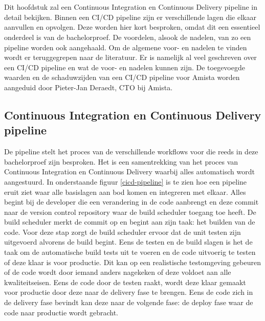 
\chapter{}
\label{ch:cicd-pipeline}
Dit hoofdstuk zal een Continuous Integration en Continuous Delivery pipeline in detail bekijken. Binnen een CI/CD pipeline zijn er verschillende lagen die elkaar aanvullen en opvolgen. Deze worden hier kort besproken, omdat dit een essentieel onderdeel is van de bachelorproef. De voordelen, alsook de nadelen, van zo een pipeline worden ook aangehaald. Om de algemene voor- en nadelen te vinden wordt er teruggegrepen naar de literatuur. Er is namelijk al veel geschreven over een CI/CD pipeline en wat de voor- en nadelen kunnen zijn. De toegevoegde waarden en de schaduwzijden van een CI/CD pipeline voor Amista worden aangeduid door Pieter-Jan Deraedt, CTO bij Amista.

    \section{Continuous Integration en Continuous Delivery pipeline}
    De pipeline stelt het proces van de verschillende workflows voor die reeds in deze bachelorproef zijn besproken. Het is een samentrekking van het proces van Continuous Integration en Continuous Delivery waarbij alles automatisch wordt aangestuurd. In onderstaande figuur \ref{cicd-pipeline} is te zien hoe een pipeline eruit ziet waar alle basislagen aan bod komen en integreren met elkaar.
    Alles begint bij de developer die een verandering in de code aanbrengt en deze commit naar de version control repository waar de build scheduler toegang toe heeft. De build scheduler merkt de commit op en begint aan zijn taak: het builden van de code. Voor deze stap zorgt de build scheduler ervoor dat de unit testen zijn uitgevoerd alvorens de build begint. Eens de testen en de build slagen is het de taak om de automatische build tests uit te voeren en de code uitvoerig te testen of deze klaar is voor productie. Dit kan op een realistische testomgeving gebeuren of de code wordt door iemand anders nagekeken of deze voldoet aan alle kwaliteitseisen. Eens de code door de testen raakt, wordt deze klaar gemaakt voor productie door deze naar de delivery fase te brengen. Eens de code zich in de delivery fase bevindt kan deze naar de volgende fase: de deploy fase waar de code naar productie wordt gebracht.
    
